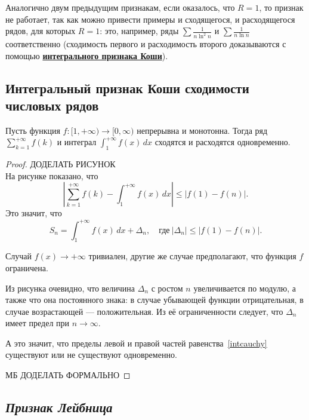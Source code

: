 \begin{remark}
	Аналогично двум предыдущим признакам, если оказалось, что \(R = 1\), то признак не работает, так как можно привести примеры и сходящегося, и расходящегося рядов, для которых \(R = 1\): это, например, ряды \(\sum \frac{1}{n \ln^2 n}\) и \(\sum \frac{1}{n \ln n}\) соответственно (сходимость первого и расходимость второго доказываются с помощью \hyperlink{интегральный признак Коши}{\bfseries интегрального признака Коши}).
\end{remark}

\subsection{Интегральный признак Коши сходимости числовых рядов}

\begin{theorem} \hypertarget{интегральный признак Коши}{}
	Пусть функция \(f \colon [1, +\infty) \to [0, \infty)\) непрерывна и монотонна. Тогда ряд \(\displaystyle \sum_{k=1}^{+\infty} f(k)\) и интеграл \(\displaystyle \int_{1}^{+\infty} f(x) \, dx\) сходятся и расходятся одновременно.
\end{theorem}
\begin{proof}
	ДОДЕЛАТЬ РИСУНОК \\
	На рисунке показано, что \[
		\left|\sum_{k=1}^{+\infty} f(k) - \int_{1}^{+\infty} f(x) \, dx \right| \leqslant |f(1) - f(n)|.
	\]
	Это значит, что
	\begin{equation} \label{intcauchy}
		S_n = \displaystyle \int_{1}^{+\infty} f(x) \, dx + \Delta_n, \quad \text{где} \ |\Delta_n| \leqslant |f(1) - f(n)|.
	\end{equation}
	
	Случай \(f(x) \to +\infty\) тривиален, другие же случае предполагают, что функция \(f\) ограничена.
	
	Из рисунка очевидно, что величина \(\Delta_n\) с ростом \(n\) увеличивается по модулю, а также что она постоянного знака: в случае убывающей функции отрицательная, в случае возрастающей --- положительная. Из её ограниченности следует, что \(\Delta_n\) имеет предел при  \(n \to \infty\).
	
	А это значит, что пределы левой и правой частей равенства~\eqref{intcauchy} существуют или не существуют одновременно.
	
	МБ ДОДЕЛАТЬ ФОРМАЛЬНО
\end{proof}

\subsection{\itshape Признак Лейбница}

